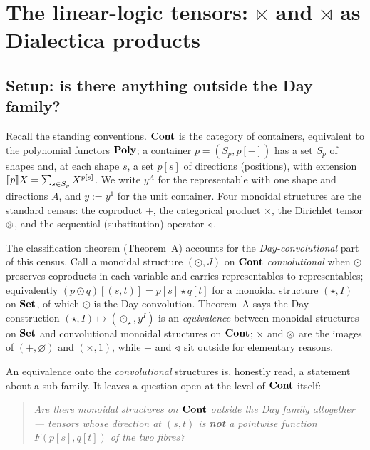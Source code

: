 \maketitle

\section{The linear-logic tensors: $\ltimes$ and $\rtimes$ as Dialectica
  products}
\label{sec:dialectica}

\subsection{Setup: is there anything outside the Day family?}
\label{sec:dia-setup}

Recall the standing conventions. $\mathbf{Cont}$ is the category of containers,
equivalent to the polynomial functors $\mathbf{Poly}$; a container $p=(S_p,p[-])$ has a
set $S_p$ of shapes and, at each shape $s$, a set $p[s]$ of directions
(positions), with extension $\llbracket p \rrbracket X=\sum_{s\in S_p}X^{p[s]}$. We write
$y^A$ for the representable with one shape and directions $A$, and $y:=y^1$ for
the unit container. Four monoidal structures are the standard census: the
coproduct $+$, the categorical product $\times$, the Dirichlet tensor $\mathbin{\otimes}$,
and the sequential (substitution) operator $\mathbin{\triangleleft}$.

The classification theorem (Theorem~A) accounts for the \emph{Day-convolutional}
part of this census. Call a monoidal structure $(\odot,J)$ on $\mathbf{Cont}$
\emph{convolutional} when $\odot$ preserves coproducts in each variable and
carries representables to representables; equivalently
$(p\odot q)[(s,t)]=p[s]\star q[t]$ for a monoidal structure $(\star,I)$ on
$\mathbf{Set}$, of which $\odot$ is the Day convolution. Theorem~A says the Day
construction $(\star,I)\mapsto(\odot_\star,y^I)$ is an \emph{equivalence} between
monoidal structures on $\mathbf{Set}$ and convolutional monoidal structures on $\mathbf{Cont}$;
$\times$ and $\mathbin{\otimes}$ are the images of $(+,\varnothing)$ and $(\times,1)$, while
$+$ and $\mathbin{\triangleleft}$ sit outside for elementary reasons.

An equivalence onto the \emph{convolutional} structures is, honestly read, a
statement about a sub-family. It leaves a question open at the level of $\mathbf{Cont}$
itself:

\begin{quote}
\emph{Are there monoidal structures on $\mathbf{Cont}$ outside the Day family
altogether --- tensors whose direction at $(s,t)$ is \textbf{not} a pointwise
function $F(p[s],q[t])$ of the two fibres?}
\end{quote}

